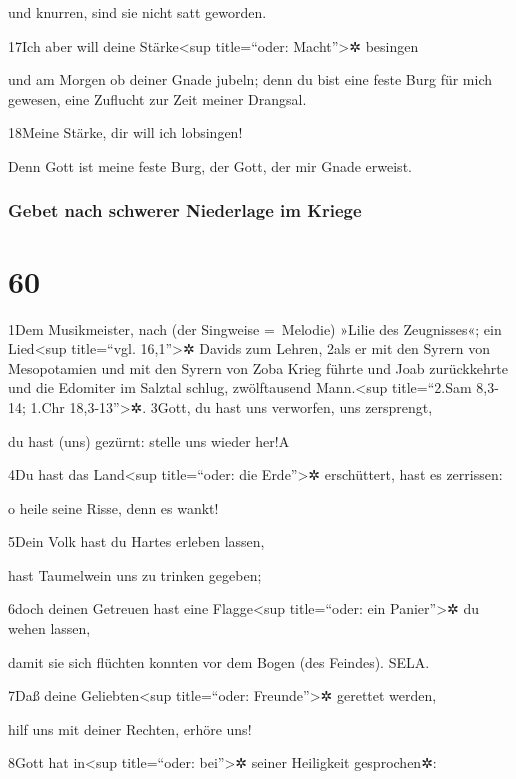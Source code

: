 und knurren, sind sie nicht satt geworden.

17Ich aber will deine Stärke\textless sup title=``oder:
Macht''\textgreater✲ besingen

und am Morgen ob deiner Gnade jubeln; denn du bist eine feste Burg für
mich gewesen, eine Zuflucht zur Zeit meiner Drangsal.

18Meine Stärke, dir will ich lobsingen!

Denn Gott ist meine feste Burg, der Gott, der mir Gnade erweist.

\hypertarget{gebet-nach-schwerer-niederlage-im-kriege}{%
\subsubsection{Gebet nach schwerer Niederlage im
Kriege}\label{gebet-nach-schwerer-niederlage-im-kriege}}

\hypertarget{section-59}{%
\section{60}\label{section-59}}

1Dem Musikmeister, nach (der Singweise =~Melodie) »Lilie des
Zeugnisses«; ein Lied\textless sup title=``vgl. 16,1''\textgreater✲
Davids zum Lehren, 2als er mit den Syrern von Mesopotamien und mit den
Syrern von Zoba Krieg führte und Joab zurückkehrte und die Edomiter im
Salztal schlug, zwölftausend Mann.\textless sup title=``2.Sam 8,3-14;
1.Chr 18,3-13''\textgreater✲. 3Gott, du hast uns verworfen, uns
zersprengt,

du hast (uns) gezürnt: stelle uns wieder her!{A}

4Du hast das Land\textless sup title=``oder: die Erde''\textgreater✲
erschüttert, hast es zerrissen:

o heile seine Risse, denn es wankt!

5Dein Volk hast du Hartes erleben lassen,

hast Taumelwein uns zu trinken gegeben;

6doch deinen Getreuen hast eine Flagge\textless sup title=``oder: ein
Panier''\textgreater✲ du wehen lassen,

damit sie sich flüchten konnten vor dem Bogen (des Feindes). SELA.

7Daß deine Geliebten\textless sup title=``oder: Freunde''\textgreater✲
gerettet werden,

hilf uns mit deiner Rechten, erhöre uns!

8Gott hat in\textless sup title=``oder: bei''\textgreater✲ seiner
Heiligkeit gesprochen✲:

